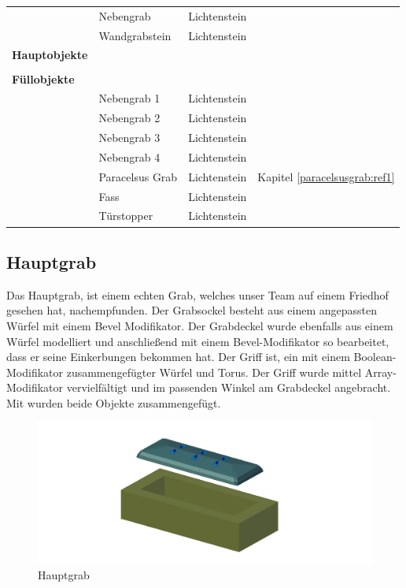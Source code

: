 \begin{tabular}{l|l|l|l}
    & Nebengrab & Lichtenstein & \\
    & Wandgrabstein & Lichtenstein & \\
    \hline
    \textbf{Hauptobjekte} &  &  & \\
    &  &  & \\
    \hline
    \textbf{Füllobjekte} &  &  & \\
    & Nebengrab 1 & Lichtenstein & \\
    & Nebengrab 2 & Lichtenstein & \\
    & Nebengrab 3 & Lichtenstein & \\
    & Nebengrab 4 & Lichtenstein & \\
    & Paracelsus Grab & Lichtenstein & Kapitel \ref{paracelsusgrab:ref1} \\
    & Fass & Lichtenstein & \\
    & Türstopper & Lichtenstein & \\
    \hline
\end{tabular}

\subsection{Hauptgrab}
\label{Hauptgrab:Heading}
Das Hauptgrab, ist einem echten Grab, welches unser Team auf einem Friedhof gesehen hat, nachempfunden. Der Grabsockel besteht aus einem angepassten Würfel
mit einem Bevel Modifikator. Der Grabdeckel wurde ebenfalls aus einem Würfel modelliert und anschließend mit einem Bevel-Modifikator so bearbeitet, dass
er seine Einkerbungen bekommen hat. Der Griff ist, ein mit einem Boolean-Modifikator zusammengefügter Würfel und Torus.
Der Griff wurde mittel Array-Modifikator vervielfältigt und im passenden Winkel am Grabdeckel angebracht. Mit  wurden beide Objekte zusammengefügt.

\raggedbottom
\begin{figure}[H]
    \centering
    \includegraphics[width=.8\textwidth]{images/Hauptgrab_Grab.png}
    \caption{Hauptgrab}
    \label{Hauptgrab:Image1}
\end{figure}

